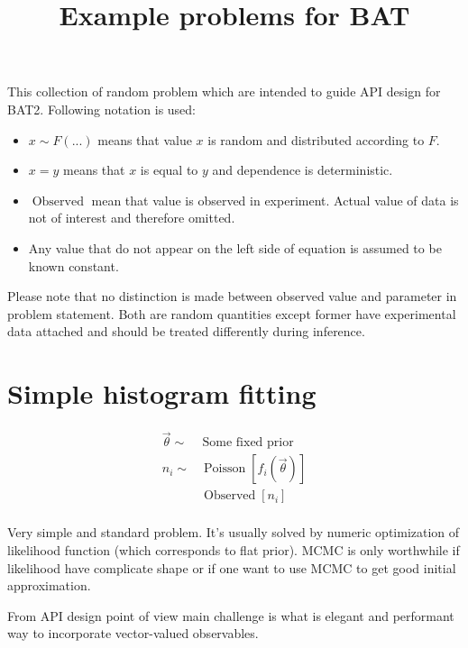 \documentclass[a4paper]{article}
\title{Example problems for BAT}
\newcommand{\Observed}{\operatorname{Observed}}
\begin{document}
\maketitle

This collection of random problem which are intended to guide API design for
BAT2. Following notation is used:

\begin{itemize}
\item $x \sim F(...)$ means that value $x$ is random and distributed according
  to $F$.
\item $x = y$ means that $x$ is equal to $y$ and dependence is deterministic.
\item $\operatorname{Observed}$ mean that value is observed in
  experiment. Actual value of data is not of interest and therefore omitted.
\item Any value that do not appear on the left side of equation is assumed to be
  known constant.
\end{itemize}

Please note that no distinction is made between observed value and parameter in
problem statement. Both are random quantities except former have experimental
data attached and should be treated differently during inference.


\section{Simple histogram fitting}

\begin{equation}
  \begin{aligned}
    \vec\theta \sim& \,\mbox{Some fixed prior} \\
    n_i        \sim& \operatorname{Poisson}[ f_i(\vec\theta) ] \\
    &\Observed[n_i]\\
  \end{aligned}
\end{equation}

Very simple and standard problem. It's usually solved by numeric optimization of
likelihood function (which corresponds to flat prior). MCMC is only worthwhile
if likelihood have complicate shape or if one want to use MCMC to get good
initial approximation.

From API design point of view main challenge is what is elegant and performant
way to incorporate vector-valued observables.
\end{document}
